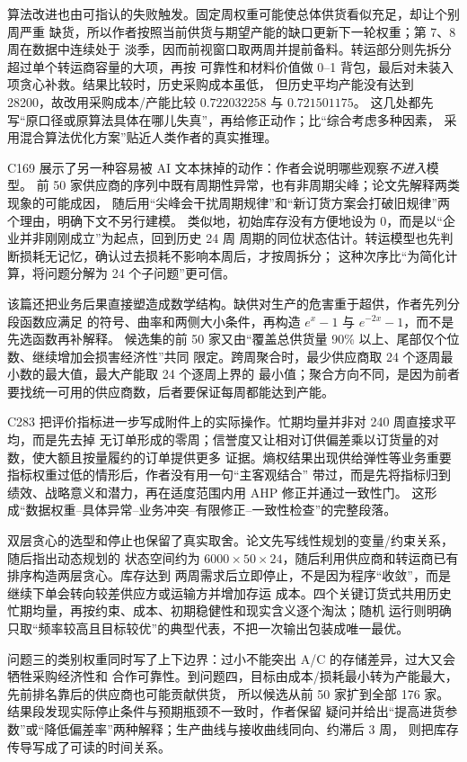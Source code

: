 算法改进也由可指认的失败触发。固定周权重可能使总体供货看似充足，却让个别周严重
缺货，所以作者按照当前供货与期望产能的缺口更新下一轮权重；第 7、8 周在数据中连续处于
淡季，因而前视窗口取两周并提前备料。转运部分则先拆分超过单个转运商容量的大项，再按
可靠性和材料价值做 0--1 背包，最后对未装入项贪心补救。结果比较时，历史采购成本虽低，
但历史平均产能没有达到 28200，故改用采购成本/产能比较 $0.722032258$ 与 $0.721501175$。
这几处都先写“原口径或原算法具体在哪儿失真”，再给修正动作；比“综合考虑多种因素，
采用混合算法优化方案”贴近人类作者的真实推理。

C169 展示了另一种容易被 AI 文本抹掉的动作：作者会说明哪些观察\emph{不进入}模型。
前 50 家供应商的序列中既有周期性异常，也有非周期尖峰；论文先解释两类现象的可能成因，
随后用“尖峰会干扰周期规律”和“新订货方案会打破旧规律”两个理由，明确下文不另行建模。
类似地，初始库存没有方便地设为 0，而是以“企业并非刚刚成立”为起点，回到历史 24 周
周期的同位状态估计。转运模型也先判断损耗无记忆，确认过去损耗不影响本周后，才按周拆分；
这种次序比“为简化计算，将问题分解为 24 个子问题”更可信。

该篇还把业务后果直接塑造成数学结构。缺供对生产的危害重于超供，作者先列分段函数应满足
的符号、曲率和两侧大小条件，再构造 $e^x-1$ 与 $e^{-2x}-1$，而不是先选函数再补解释。
候选集的前 50 家又由“覆盖总供货量 90\% 以上、尾部仅个位数、继续增加会损害经济性”共同
限定。跨周聚合时，最少供应商取 24 个逐周最小数的最大值，最大产能取 24 个逐周上界的
最小值；聚合方向不同，是因为前者要找统一可用的供应商数，后者要保证每周都能达到产能。

C283 把评价指标进一步写成附件上的实际操作。忙期均量并非对 240 周直接求平均，而是先去掉
无订单形成的零周；信誉度又让相对订供偏差乘以订货量的对数，使大额且按量履约的订单提供更多
证据。熵权结果出现供给弹性等业务重要指标权重过低的情形后，作者没有用一句“主客观结合”
带过，而是先将指标归到绩效、战略意义和潜力，再在适度范围内用 AHP 修正并通过一致性门。
这形成“数据权重--具体异常--业务冲突--有限修正--一致性检查”的完整段落。

双层贪心的选型和停止也保留了真实取舍。论文先写线性规划的变量/约束关系，随后指出动态规划的
状态空间约为 $6000\times50\times24$，随后利用供应商和转运商已有排序构造两层贪心。库存达到
两周需求后立即停止，不是因为程序“收敛”，而是继续下单会转向较差供应方或运输方并增加存运
成本。四个关键订货式共用历史忙期均量，再按约束、成本、初期稳健性和现实含义逐个淘汰；随机
运行则明确只取“频率较高且目标较优”的典型代表，不把一次输出包装成唯一最优。

问题三的类别权重同时写了上下边界：过小不能突出 A/C 的存储差异，过大又会牺牲采购经济性和
合作可靠性。到问题四，目标由成本/损耗最小转为产能最大，先前排名靠后的供应商也可能贡献供货，
所以候选从前 50 家扩到全部 176 家。结果段发现实际停止条件与预期瓶颈不一致时，作者保留
疑问并给出“提高进货参数”或“降低偏差率”两种解释；生产曲线与接收曲线同向、约滞后 3 周，
则把库存传导写成了可读的时间关系。

